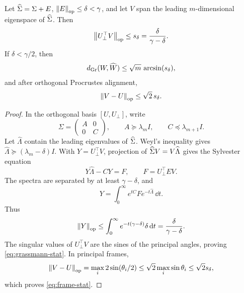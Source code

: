 \begin{lemma}
\label{lem:spectral-subspace}
Let \(\widehat\Sigma=\Sigma+E\),
\(\left\lVert E\right\rVert_{\operatorname{op}}\le\delta<\gamma\), and let \(V\) span the leading
\(m\)-dimensional eigenspace of \(\widehat\Sigma\).  Then
\begin{equation}
  \left\lVert U_\perp^\top V\right\rVert_{\operatorname{op}}
  \le s_\delta=\frac{\delta}{\gamma-\delta}.
  \label{eq:sin-theta}
\end{equation}
If \(\delta<\gamma/2\), then
\begin{equation}
  d_{\mathrm{Gr}}(W,\widehat W)
  \le\sqrt m\,\arcsin(s_\delta),
  \label{eq:grassmann-stat}
\end{equation}
and after orthogonal Procrustes alignment,
\begin{equation}
  \left\lVert V-U\right\rVert_{\operatorname{op}}\le\sqrt2\,s_\delta.
  \label{eq:frame-stat}
\end{equation}
\end{lemma}

\begin{proof}
In the orthogonal basis \([U,U_\perp]\), write
\[
  \Sigma=\begin{pmatrix}A&0\\0&C\end{pmatrix},
  \qquad A\succeq\lambda_mI,
  \qquad C\preceq\lambda_{m+1}I.
\]
Let \(\widehat\Lambda\) contain the leading eigenvalues of \(\widehat\Sigma\).
Weyl's inequality gives
\(\widehat\Lambda\succeq(\lambda_m-\delta)I\).  With
\(Y=U_\perp^\top V\), projection of
\(\widehat\Sigma V=V\widehat\Lambda\) gives the Sylvester equation
\[
  Y\widehat\Lambda-CY=F,
  \qquad F=U_\perp^\top EV.
\]
The spectra are separated by at least \(\gamma-\delta\), and
\[
  Y=\int_0^\infty e^{tC}Fe^{-t\widehat\Lambda}\,\dd t.
\]
Thus
\[
  \left\lVert Y\right\rVert_{\operatorname{op}}
  \le\int_0^\infty e^{-t(\gamma-\delta)}\delta\,\mathrm d t
  =\frac{\delta}{\gamma-\delta}.
\]
The singular values of \(U_\perp^\top V\) are the sines of the principal
angles, proving \eqref{eq:grassmann-stat}.  In principal frames,
\[
  \left\lVert V-U\right\rVert_{\operatorname{op}}
  =\max_i2\sin(\theta_i/2)
  \le\sqrt2\max_i\sin\theta_i
  \le\sqrt2s_\delta,
\]
which proves \eqref{eq:frame-stat}.
\end{proof}

